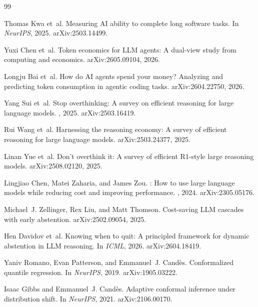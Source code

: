 \documentclass{article}
\begin{document}
{\small
\begin{thebibliography}{99}

Thomas Kwa et~al.
\newblock Measuring {AI} ability to complete long software tasks.
\newblock In {\em NeurIPS}, 2025.
\newblock arXiv:2503.14499.

Yuxi Chen et~al.
\newblock Token economics for {LLM} agents: A dual-view study from computing and economics.
\newblock arXiv:2605.09104, 2026.

Longju Bai et~al.
\newblock How do {AI} agents spend your money? Analyzing and predicting token consumption in agentic coding tasks.
\newblock arXiv:2604.22750, 2026.

Yang Sui et~al.
\newblock Stop overthinking: A survey on efficient reasoning for large language models.
, 2025.
\newblock arXiv:2503.16419.

Rui Wang et~al.
\newblock Harnessing the reasoning economy: A survey of efficient reasoning for large language models.
\newblock arXiv:2503.24377, 2025.

Linan Yue et~al.
\newblock Don't overthink it: A survey of efficient {R1}-style large reasoning models.
\newblock arXiv:2508.02120, 2025.

Lingjiao Chen, Matei Zaharia, and James Zou.
: How to use large language models while reducing cost and improving performance.
, 2024.
\newblock arXiv:2305.05176.

Michael~J. Zellinger, Rex Liu, and Matt Thomson.
\newblock Cost-saving {LLM} cascades with early abstention.
\newblock arXiv:2502.09054, 2025.

Hen Davidov et~al.
\newblock Knowing when to quit: A principled framework for dynamic abstention in {LLM} reasoning.
\newblock In {\em ICML}, 2026.
\newblock arXiv:2604.18419.

Yaniv Romano, Evan Patterson, and Emmanuel~J. Cand{\`e}s.
\newblock Conformalized quantile regression.
\newblock In {\em NeurIPS}, 2019.
\newblock arXiv:1905.03222.

Isaac Gibbs and Emmanuel~J. Cand{\`e}s.
\newblock Adaptive conformal inference under distribution shift.
\newblock In {\em NeurIPS}, 2021.
\newblock arXiv:2106.00170.


\end{thebibliography}}
\end{document}
